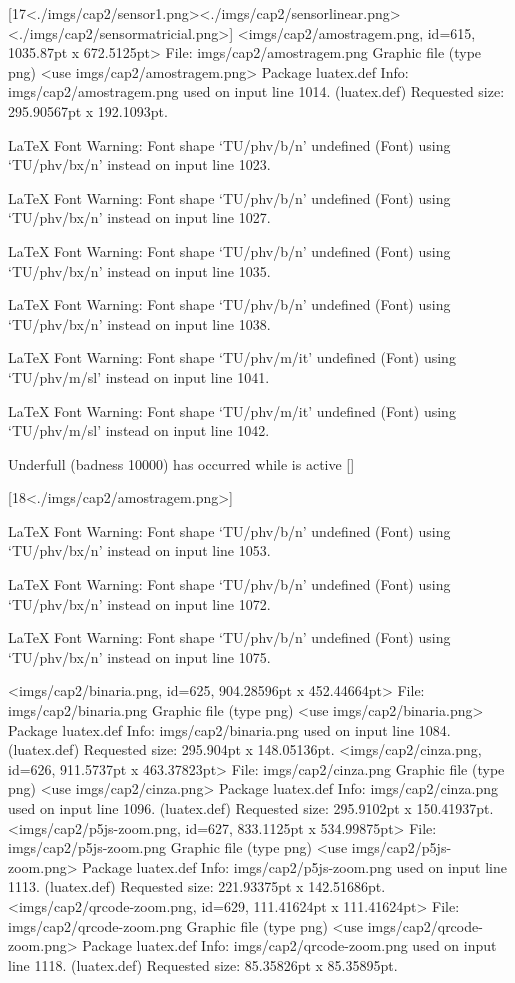 [17<./imgs/cap2/sensor1.png><./imgs/cap2/sensorlinear.png><./imgs/cap2/sensormatricial.png>]
<imgs/cap2/amostragem.png, id=615, 1035.87pt x 672.5125pt>
File: imgs/cap2/amostragem.png Graphic file (type png)
<use imgs/cap2/amostragem.png>
Package luatex.def Info: imgs/cap2/amostragem.png  used on input line 1014.
(luatex.def)             Requested size: 295.90567pt x 192.1093pt.

LaTeX Font Warning: Font shape `TU/phv/b/n' undefined
(Font)              using `TU/phv/bx/n' instead on input line 1023.


LaTeX Font Warning: Font shape `TU/phv/b/n' undefined
(Font)              using `TU/phv/bx/n' instead on input line 1027.


LaTeX Font Warning: Font shape `TU/phv/b/n' undefined
(Font)              using `TU/phv/bx/n' instead on input line 1035.


LaTeX Font Warning: Font shape `TU/phv/b/n' undefined
(Font)              using `TU/phv/bx/n' instead on input line 1038.


LaTeX Font Warning: Font shape `TU/phv/m/it' undefined
(Font)              using `TU/phv/m/sl' instead on input line 1041.


LaTeX Font Warning: Font shape `TU/phv/m/it' undefined
(Font)              using `TU/phv/m/sl' instead on input line 1042.


Underfull \vbox (badness 10000) has occurred while \output is active []

[18<./imgs/cap2/amostragem.png>]

LaTeX Font Warning: Font shape `TU/phv/b/n' undefined
(Font)              using `TU/phv/bx/n' instead on input line 1053.


LaTeX Font Warning: Font shape `TU/phv/b/n' undefined
(Font)              using `TU/phv/bx/n' instead on input line 1072.


LaTeX Font Warning: Font shape `TU/phv/b/n' undefined
(Font)              using `TU/phv/bx/n' instead on input line 1075.

<imgs/cap2/binaria.png, id=625, 904.28596pt x 452.44664pt>
File: imgs/cap2/binaria.png Graphic file (type png)
<use imgs/cap2/binaria.png>
Package luatex.def Info: imgs/cap2/binaria.png  used on input line 1084.
(luatex.def)             Requested size: 295.904pt x 148.05136pt.
<imgs/cap2/cinza.png, id=626, 911.5737pt x 463.37823pt>
File: imgs/cap2/cinza.png Graphic file (type png)
<use imgs/cap2/cinza.png>
Package luatex.def Info: imgs/cap2/cinza.png  used on input line 1096.
(luatex.def)             Requested size: 295.9102pt x 150.41937pt.
<imgs/cap2/p5js-zoom.png, id=627, 833.1125pt x 534.99875pt>
File: imgs/cap2/p5js-zoom.png Graphic file (type png)
<use imgs/cap2/p5js-zoom.png>
Package luatex.def Info: imgs/cap2/p5js-zoom.png  used on input line 1113.
(luatex.def)             Requested size: 221.93375pt x 142.51686pt.
<imgs/cap2/qrcode-zoom.png, id=629, 111.41624pt x 111.41624pt>
File: imgs/cap2/qrcode-zoom.png Graphic file (type png)
<use imgs/cap2/qrcode-zoom.png>
Package luatex.def Info: imgs/cap2/qrcode-zoom.png  used on input line 1118.
(luatex.def)             Requested size: 85.35826pt x 85.35895pt.

